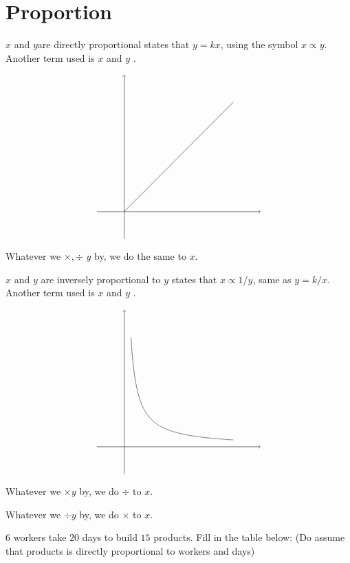 \documentclass[8pt]{article}
\author{\Author}
\title{\Title}
\date{\Date}
\begin{document}
	\maketitle

	\tableofcontents

	\section{Proportion}

		\defi {} \(x\) and \(y\)are directly proportional states that \(y = kx\), using the symbol \(x \propto y\). Another term used is \(x\) and \(y\) .

		\[
			\begin{tikzpicture}
				\draw[black, ->] (-1, 0)--(5, 0);
				\draw[black, ->] (0, -1)--(0, 5);
				\draw[black] (0, 0)--(4, 4);
			\end{tikzpicture}
		\]

		Whatever we \(\times, \div\) \(y\) by, we do the same to \(x\).

		\defi {} \(x\) and \(y\) are inversely proportional to \(y\) states that \(x \propto 1/y\), same as \(y = k/x\). Another term used is \(x\) and \(y\) .

		\[
			\begin{tikzpicture}
				\draw[black, ->] (-1, 0)--(5, 0);
				\draw[black, ->] (0, -1)--(0, 5);
				\draw[black, domain = 0.25:4, samples = 1000] plot (\x, {1 / \x});
			\end{tikzpicture}
		\]

		Whatever we \(\times y\) by, we do \(\div\) to \(x\).

		Whatever we \(\div y\) by, we do \(\times\) to \(x\).

		\exmp {} \(6\) workers take \(20\) days to build \(15\) products. Fill in the table below: (Do assume that products is directly proportional to workers and days)
\end{document}
